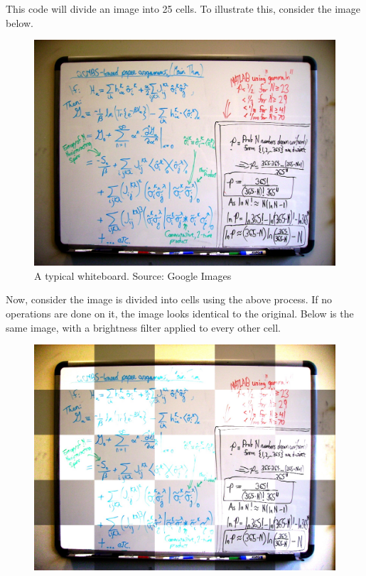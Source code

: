 \documentclass[]{article}
\begin{document}
This code will divide an image into 25 cells.  To illustrate this, consider the image below.

\begin{figure}[H]
\centering
\includegraphics[scale=0.6]{images/whiteboard}
\caption{A typical whiteboard. Source: Google Images}
\end{figure}	

Now, consider the image is divided into cells using the above process. If no operations are done on it, the image looks identical to the original.  Below is the same image, with a brightness filter applied to every other cell.

\begin{figure}[H]
\centering
\includegraphics[scale=0.15]{images/cell_brightness_5}
\end{figure}	
\end{document}
